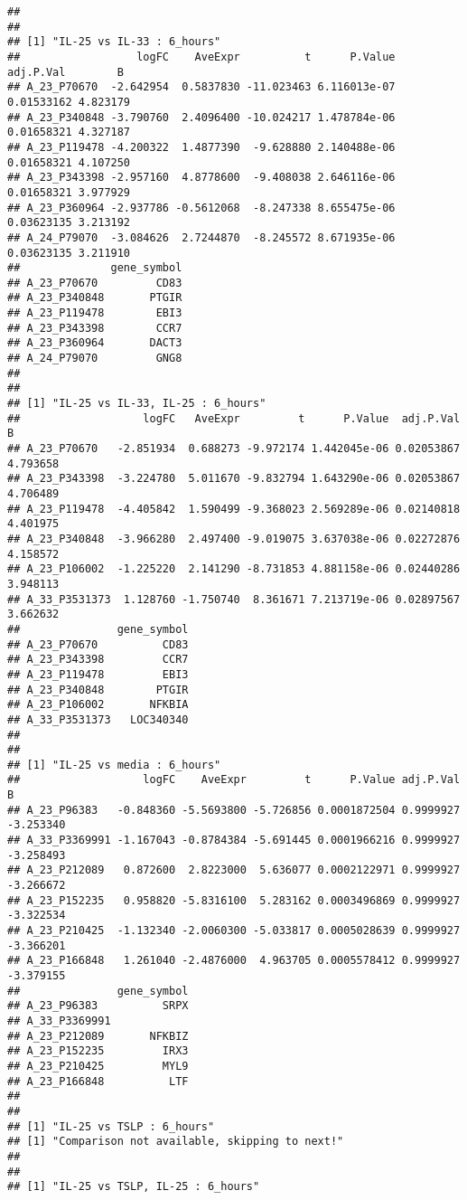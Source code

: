 \documentclass[
]{article}
\begin{document}
\begin{verbatim}
## 
## 
## [1] "IL-25 vs IL-33 : 6_hours"
##                  logFC    AveExpr          t      P.Value  adj.P.Val        B
## A_23_P70670  -2.642954  0.5837830 -11.023463 6.116013e-07 0.01533162 4.823179
## A_23_P340848 -3.790760  2.4096400 -10.024217 1.478784e-06 0.01658321 4.327187
## A_23_P119478 -4.200322  1.4877390  -9.628880 2.140488e-06 0.01658321 4.107250
## A_23_P343398 -2.957160  4.8778600  -9.408038 2.646116e-06 0.01658321 3.977929
## A_23_P360964 -2.937786 -0.5612068  -8.247338 8.655475e-06 0.03623135 3.213192
## A_24_P79070  -3.084626  2.7244870  -8.245572 8.671935e-06 0.03623135 3.211910
##              gene_symbol
## A_23_P70670         CD83
## A_23_P340848       PTGIR
## A_23_P119478        EBI3
## A_23_P343398        CCR7
## A_23_P360964       DACT3
## A_24_P79070         GNG8
## 
## 
## [1] "IL-25 vs IL-33, IL-25 : 6_hours"
##                   logFC   AveExpr         t      P.Value  adj.P.Val        B
## A_23_P70670   -2.851934  0.688273 -9.972174 1.442045e-06 0.02053867 4.793658
## A_23_P343398  -3.224780  5.011670 -9.832794 1.643290e-06 0.02053867 4.706489
## A_23_P119478  -4.405842  1.590499 -9.368023 2.569289e-06 0.02140818 4.401975
## A_23_P340848  -3.966280  2.497400 -9.019075 3.637038e-06 0.02272876 4.158572
## A_23_P106002  -1.225220  2.141290 -8.731853 4.881158e-06 0.02440286 3.948113
## A_33_P3531373  1.128760 -1.750740  8.361671 7.213719e-06 0.02897567 3.662632
##               gene_symbol
## A_23_P70670          CD83
## A_23_P343398         CCR7
## A_23_P119478         EBI3
## A_23_P340848        PTGIR
## A_23_P106002       NFKBIA
## A_33_P3531373   LOC340340
## 
## 
## [1] "IL-25 vs media : 6_hours"
##                   logFC    AveExpr         t      P.Value adj.P.Val         B
## A_23_P96383   -0.848360 -5.5693800 -5.726856 0.0001872504 0.9999927 -3.253340
## A_33_P3369991 -1.167043 -0.8784384 -5.691445 0.0001966216 0.9999927 -3.258493
## A_23_P212089   0.872600  2.8223000  5.636077 0.0002122971 0.9999927 -3.266672
## A_23_P152235   0.958820 -5.8316100  5.283162 0.0003496869 0.9999927 -3.322534
## A_23_P210425  -1.132340 -2.0060300 -5.033817 0.0005028639 0.9999927 -3.366201
## A_23_P166848   1.261040 -2.4876000  4.963705 0.0005578412 0.9999927 -3.379155
##               gene_symbol
## A_23_P96383          SRPX
## A_33_P3369991            
## A_23_P212089       NFKBIZ
## A_23_P152235         IRX3
## A_23_P210425         MYL9
## A_23_P166848          LTF
## 
## 
## [1] "IL-25 vs TSLP : 6_hours"
## [1] "Comparison not available, skipping to next!"
## 
## 
## [1] "IL-25 vs TSLP, IL-25 : 6_hours"

\end{verbatim}
\end{document}
